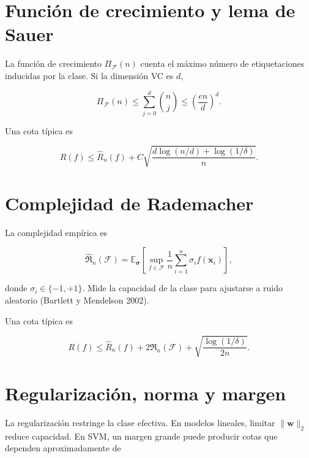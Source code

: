 \documentclass[
  spanish,
  10.5pt,
  letterpaper,
  DIV=11,
  numbers=noendperiod,
  oneside,
  open=any]{scrreprt}
\theoremstyle{definition}
\theoremstyle{definition}
\theoremstyle{plain}
\theoremstyle{remark}
\begin{document}
\section*{Función de crecimiento y lema de
Sauer}\label{funciuxf3n-de-crecimiento-y-lema-de-sauer}


La función de crecimiento \(\Pi_{\mathcal F}(n)\) cuenta el máximo
número de etiquetaciones inducidas por la clase. Si la dimensión VC es
\(d\),

\[
\Pi_{\mathcal F}(n)\le\sum_{j=0}^{d}\binom{n}{j}\le\left(\frac{en}{d}\right)^d.
\]

Una cota típica es

\[
R(f)\le\widehat R_n(f)+C\sqrt{\frac{d\log(n/d)+\log(1/\delta)}{n}}.
\]

\section*{Complejidad de Rademacher}\label{complejidad-de-rademacher}


La complejidad empírica es

\[
\widehat{\mathfrak R}_n(\mathcal F)=\mathbb E_{\boldsymbol\sigma}\left[\sup_{f\in\mathcal F}\frac1n\sum_{i=1}^n\sigma_i f(\mathbf x_i)\right],
\]

donde \(\sigma_i\in\{-1,+1\}\). Mide la capacidad de la clase para
ajustarse a ruido aleatorio (Bartlett y Mendelson 2002).

Una cota típica es

\[
R(f)\le\widehat R_n(f)+2\mathfrak R_n(\mathcal F)+\sqrt{\frac{\log(1/\delta)}{2n}}.
\]

\section*{Regularización, norma y
margen}\label{regularizaciuxf3n-norma-y-margen}


La regularización restringe la clase efectiva. En modelos lineales,
limitar \(\|\mathbf w\|_2\) reduce capacidad. En SVM, un margen grande
puede producir cotas que dependen aproximadamente de
\end{document}
